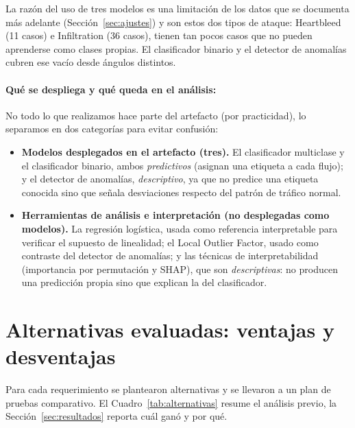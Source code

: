 \documentclass[11pt,a4paper]{article}
\begin{document}
La razón del uso de tres modelos es una limitación de los datos que
se documenta más adelante (Sección~\ref{sec:ajustes}) y son estos dos tipos de ataque:
 Heartbleed (11 casos) e Infiltration (36 casos), tienen tan pocos casos que no pueden aprenderse como clases propias. El clasificador binario y el detector de
anomalías cubren ese vacío desde ángulos distintos.

\paragraph{Qué se despliega y qué queda en el análisis:} 
No todo lo que realizamos hace parte del artefacto (por practicidad), lo separamos en dos
categorías para evitar confusión:

\begin{itemize}
\item \textbf{Modelos desplegados en el artefacto (tres).} El clasificador
multiclase y el clasificador binario, ambos \emph{predictivos} (asignan una
etiqueta a cada flujo); y el detector de anomalías, \emph{descriptivo}, ya que  no predice una etiqueta conocida sino que señala desviaciones respecto
del patrón de tráfico normal.
\item \textbf{Herramientas de análisis e interpretación (no desplegadas como
modelos).} La regresión logística, usada como referencia interpretable para
verificar el supuesto de linealidad; el Local Outlier Factor, usado como
contraste del detector de anomalías; y las técnicas de interpretabilidad
(importancia por permutación y SHAP), que son \emph{descriptivas}: no
producen una predicción propia sino que explican la del clasificador.
\end{itemize}

\section{Alternativas evaluadas: ventajas y desventajas}

Para cada requerimiento se plantearon alternativas y se llevaron a un plan de
pruebas comparativo. El Cuadro~\ref{tab:alternativas} resume el análisis
previo, la Sección~\ref{sec:resultados} reporta cuál ganó y por qué.
\end{document}
